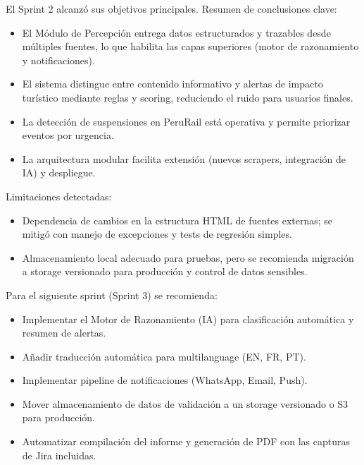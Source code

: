 \documentclass[12pt,a4paper]{article}
\newcommand{\sectiontitle}[1]{\vspace{0.6cm}\noindent{\fontsize{13}{15}\selectfont\textbf{#1}}\par\vspace{0.15cm}\noindent{\fontsize{12}{14}\selectfont}}
\newcommand{\bodytext}[1]{{\fontsize{12}{14}\selectfont #1}\par}
\begin{document}
\sectiontitle{Conclusiones}
\bodytext{El Sprint 2 alcanzó sus objetivos principales. Resumen de conclusiones clave:}
\begin{itemize}
  \item El Módulo de Percepción entrega datos estructurados y trazables desde múltiples fuentes, lo que habilita las capas superiores (motor de razonamiento y notificaciones).
  \item El sistema distingue entre contenido informativo y alertas de impacto turístico mediante reglas y scoring, reduciendo el ruido para usuarios finales.
  \item La detección de suspensiones en PeruRail está operativa y permite priorizar eventos por urgencia.
  \item La arquitectura modular facilita extensión (nuevos scrapers, integración de IA) y despliegue.
\end{itemize}
\bodytext{Limitaciones detectadas:}
\begin{itemize}
  \item Dependencia de cambios en la estructura HTML de fuentes externas; se mitigó con manejo de excepciones y tests de regresión simples.
  \item Almacenamiento local adecuado para pruebas, pero se recomienda migración a storage versionado para producción y control de datos sensibles.
\end{itemize}

\sectiontitle{Recomendaciones}
\bodytext{Para el siguiente sprint (Sprint 3) se recomienda:}
\begin{itemize}
  \item Implementar el Motor de Razonamiento (IA) para clasificación automática y resumen de alertas.
  \item Añadir traducción automática para multilanguage (EN, FR, PT).
  \item Implementar pipeline de notificaciones (WhatsApp, Email, Push).
  \item Mover almacenamiento de datos de validación a un storage versionado o S3 para producción.
  \item Automatizar compilación del informe y generación de PDF con las capturas de Jira incluidas.
\end{itemize}
\end{document}
